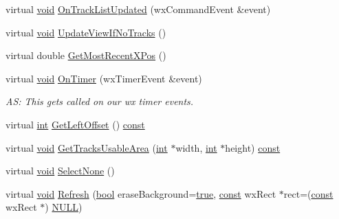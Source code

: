 \begin{DoxyCompactItemize}
\item 
virtual \hyperlink{sound_8c_ae35f5844602719cf66324f4de2a658b3}{void} \hyperlink{class_track_panel_ab05904aa3f0df40bff7406b1138bff25}{On\+Track\+List\+Updated} (wx\+Command\+Event \&event)
\item 
virtual \hyperlink{sound_8c_ae35f5844602719cf66324f4de2a658b3}{void} \hyperlink{class_track_panel_a0f8ae75f704431389d371cb24f394a8b}{Update\+View\+If\+No\+Tracks} ()
\item 
virtual double \hyperlink{class_track_panel_a159b2d7e386c3a3a8dbd8ebff7c0ffc1}{Get\+Most\+Recent\+X\+Pos} ()
\item 
virtual \hyperlink{sound_8c_ae35f5844602719cf66324f4de2a658b3}{void} \hyperlink{class_track_panel_a8cddb063467280ce559807d31493b67a}{On\+Timer} (wx\+Timer\+Event \&event)
\begin{DoxyCompactList}\small\item\em AS\+: This gets called on our wx timer events. \end{DoxyCompactList}\item 
virtual \hyperlink{xmltok_8h_a5a0d4a5641ce434f1d23533f2b2e6653}{int} \hyperlink{class_track_panel_aec356825170c0c5fd323cd01efa3a967}{Get\+Left\+Offset} () \hyperlink{getopt1_8c_a2c212835823e3c54a8ab6d95c652660e}{const} 
\item 
virtual \hyperlink{sound_8c_ae35f5844602719cf66324f4de2a658b3}{void} \hyperlink{class_track_panel_a1e163e8d35e12fd7b48daaaec31879a4}{Get\+Tracks\+Usable\+Area} (\hyperlink{xmltok_8h_a5a0d4a5641ce434f1d23533f2b2e6653}{int} $\ast$width, \hyperlink{xmltok_8h_a5a0d4a5641ce434f1d23533f2b2e6653}{int} $\ast$height) \hyperlink{getopt1_8c_a2c212835823e3c54a8ab6d95c652660e}{const} 
\item 
virtual \hyperlink{sound_8c_ae35f5844602719cf66324f4de2a658b3}{void} \hyperlink{class_track_panel_a942c08d24411790207fd1e275448516e}{Select\+None} ()
\item 
virtual \hyperlink{sound_8c_ae35f5844602719cf66324f4de2a658b3}{void} \hyperlink{class_track_panel_ae81fd0fd442170965441800734fcf212}{Refresh} (\hyperlink{mac_2config_2i386_2lib-src_2libsoxr_2soxr-config_8h_abb452686968e48b67397da5f97445f5b}{bool} erase\+Background=\hyperlink{mac_2config_2i386_2lib-src_2libsoxr_2soxr-config_8h_a41f9c5fb8b08eb5dc3edce4dcb37fee7}{true}, \hyperlink{getopt1_8c_a2c212835823e3c54a8ab6d95c652660e}{const} wx\+Rect $\ast$rect=(\hyperlink{getopt1_8c_a2c212835823e3c54a8ab6d95c652660e}{const} wx\+Rect $\ast$) \hyperlink{px__mixer_8h_a070d2ce7b6bb7e5c05602aa8c308d0c4}{N\+U\+LL})
\item 

\end{DoxyCompactItemize}
